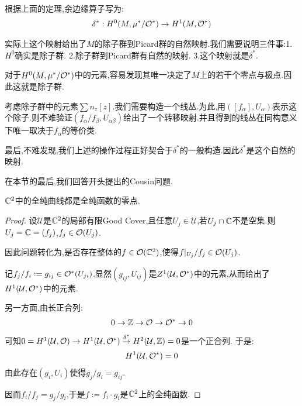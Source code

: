 根据上面的定理,余边缘算子写为:
\begin{align*}
	\delta^*: H^0(M,\mu^*/\mathcal{O}^*) \to H^1(M,\mathcal{O}^*)
\end{align*}

实际上这个映射给出了$M$的除子群到Picard群的自然映射.我们需要说明三件事:1.$H^0$确实是除子群. 2.除子群到Picard群有自然的映射. 3.这个映射就是$\delta^*$.

对于$H^0(M,\mu^*/\mathcal{O}^*)$中的元素,容易发现其唯一决定了$M$上的若干个零点与极点.因此这就是除子群.

考虑除子群中的元素$\sum n_z [z]$.我们需要构造一个线丛.为此,用$([f_\alpha],U_\alpha)$表示这个除子.则不难验证$(f_\alpha/f_\beta,U_{\alpha\beta})$给出了一个转移映射.并且得到的线丛在同构意义下唯一取决于$f_\alpha$的等价类.

最后,不难发现,我们上述的操作过程正好契合于$\delta^*$的一般构造.因此$\delta^*$是这个自然的映射.

在本节的最后,我们回答开头提出的Cousin问题.
\begin{theorem}[Cousin]
	$\mathbb{C}^2$中的全纯曲线都是全纯函数的零点.
\end{theorem}
\begin{proof}
	设$\mathcal{U}$是$\mathbb{C}^2$的局部有限Good Cover,且任意$U_j \in \mathcal{U}$,若$U_j \cap \mathbb{C}$不是空集.则$U_j=\mathbb{C}=(f_j)$,$f_j \in \mathcal{O}(U_j)$.

	因此问题转化为,是否存在整体的$f \in \mathcal{O}(\mathbb{C}^2)$,使得$f|_{U_j}/f_j \in \mathcal{O}(U_j)$.

	记$f_j/f_i:=g_{ij}\in \mathcal{O}^*(U_{ji})$.显然$(g_{ij},U_{ij})$是$Z^1(\mathcal{U},\mathcal{O}^*)$中的元素,从而给出了$H^1(\mathcal{U},\mathcal{O}^*)$中的元素.

	另一方面,由长正合列:
	\begin{align*}
		0 \to \mathbb{Z} \to \mathcal{O} \to \mathcal{O}^* \to 0
	\end{align*}
	可知$0=H^1(\mathcal{U},\mathcal{O}) \to H^1(\mathcal{U},\mathcal{O}^*) \stackrel{\delta^*}{\rightarrow}H^2(\mathcal{U},\mathbb{Z})=0$是一个正合列. 于是:
	\begin{align*}
		H^1(\mathcal{U},\mathcal{O}^*)=0
	\end{align*}
	由此存在$(g_i,U_i)$使得$g_j/g_i=g_{ij}$.

	因而$f_i/f_j=g_j/g_i$,于是$f:=f_i \cdot g_i$是$\mathbb{C}^2$上的全纯函数.
\end{proof}
